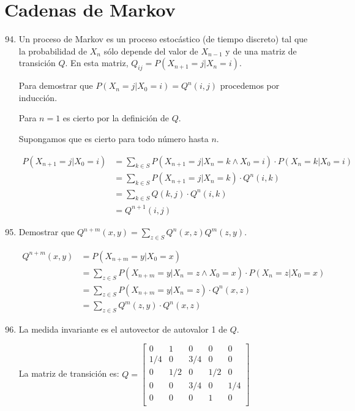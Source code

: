 \section{Cadenas de Markov}
\begin{enumerate}
	\setcounter{enumi}{93}
	\item
		Un proceso de Markov es un proceso estocástico (de tiempo discreto) tal que la probabilidad de $X_n$ sólo depende del valor de $X_{n-1}$ y de una matriz de transición $Q$.
		En esta matriz, $Q_{ij} = P(X_{n+1} = j | X_n = i)$.
		
		Para demostrar que $P(X_n = j | X_0 = i) = Q^n(i,j)$ procedemos por inducción.
		
		Para $n=1$ es cierto por la definición de $Q$.
		
		Supongamos que es cierto para todo número hasta $n$.
		
		\begin{align*}
			P(X_{n+1} = j | X_0 = i)	& = \sum_{k\in S} P(X_{n+1} = j | X_n = k \land X_0 = i) \cdot P(X_n = k | X_0 = i)	\\
										& = \sum_{k\in S} P(X_{n+1} = j | X_n = k) \cdot Q^n(i,k)							\\
										& = \sum_{k\in S} Q(k,j) \cdot Q^n(i,k)											\\
										& = Q^{n+1}(i,j)
		\end{align*}
		
	\item
		Demostrar que $Q^{n+m}(x,y) = \sum_{z\in S}Q^n(x,z) Q^m(z,y)$.
		
		\begin{align*}
			Q^{n+m}(x,y)	& = P(X_{n+m} = y | X_0=x)	\\
							& = \sum_{z\in S} P(X_{n+m} = y | X_n = z \land X_0=x) \cdot P(X_n = z | X_0=x)	\\
							& = \sum_{z\in S} P(X_{n+m} = y | X_n = z) \cdot Q^n(x,z)						\\
							& = \sum_{z\in S} Q^m(z,y) \cdot Q^n(x,z)
		\end{align*}
		
	\item
		La medida invariante es el autovector de autovalor 1 de $Q$.
		
		La matriz de transición es:
		$Q = \begin{bmatrix}
			0 & 1 & 0 & 0 & 0 \\
			1/4 & 0 & 3/4 & 0 & 0 \\
			0 & 1/2 & 0 & 1/2 & 0 \\
			0 & 0 & 3/4 & 0 & 1/4 \\
			0 & 0 & 0 & 1 & 0 \\
		\end{bmatrix}$
		

\end{enumerate}
